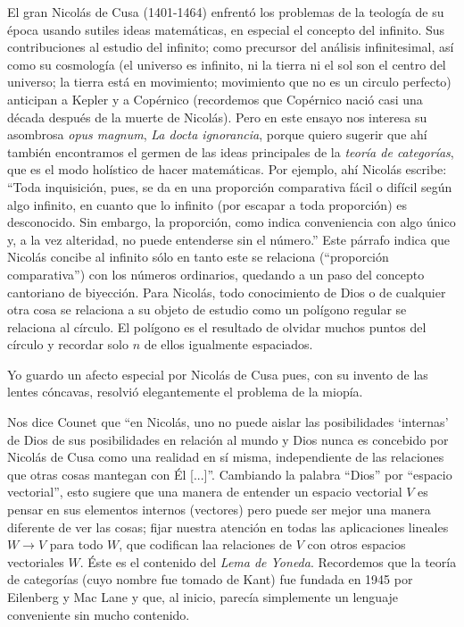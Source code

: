 \documentclass[12pt,a4paper, spanish]{amsart}
\numberwithin{equation}{section}
\theoremstyle{plain}
\theoremstyle{definition}
\begin{document}
El gran Nicolás de Cusa (1401-1464) enfrentó los problemas de la teología de su época usando sutiles ideas matemáticas, en especial el concepto del infinito. Sus contribuciones al estudio del infinito; como precursor del análisis infinitesimal, así como su cosmología (el universo es infinito, ni la tierra ni el sol son el centro del universo; la tierra está en movimiento; movimiento que no es un circulo perfecto) anticipan a Kepler y a Copérnico\autocite{davis2011renaissance} (recordemos que Copérnico nació casi una década después de la muerte de Nicolás). Pero en este ensayo nos interesa su asombrosa \emph{opus magnum}, \emph{La docta ignorancia}\autocite{cusa1984docta}, porque quiero sugerir que ahí también encontramos el germen de las ideas principales de la \emph{teoría de categorías}, que es el modo holístico de hacer matemáticas. Por ejemplo, ahí Nicolás escribe: ``Toda inquisición, pues, se da en una proporción comparativa fácil o difícil según algo infinito, en cuanto que lo infinito (por escapar a toda proporción) es desconocido. Sin embargo, la proporción, como indica conveniencia con algo único y, a la vez alteridad, no puede entenderse sin el número.'' Este párrafo indica que Nicolás concibe al infinito sólo en tanto este se relaciona (``proporción comparativa'') con los números ordinarios, quedando a un paso del concepto cantoriano de biyección. Para Nicolás, todo conocimiento de Dios o de cualquier otra cosa se relaciona a su objeto de estudio como un polígono regular se relaciona al círculo. El polígono es el resultado de olvidar muchos puntos del círculo y recordar solo $n$ de ellos igualmente espaciados.

Yo guardo un afecto especial por Nicolás de Cusa pues, con su invento de las lentes cóncavas, resolvió elegantemente el problema de la miopía. 

Nos dice Counet\autocite{counet2000mathematiques,celeyrette2011mathematics} que ``en Nicolás, uno no puede aislar las posibilidades `internas' de Dios de sus posibilidades en relación al mundo y Dios nunca es concebido por Nicolás de Cusa como una realidad en sí misma, independiente de las relaciones que otras cosas mantegan con Él [...]''. Cambiando la palabra ``Dios'' por ``espacio vectorial'', esto sugiere que una manera de entender un espacio vectorial $V$ es pensar en sus elementos internos (vectores) pero puede ser mejor una manera diferente de ver las cosas; fijar nuestra atención en todas las aplicaciones lineales $W\to V$ para todo $W$, que codifican laa relaciones de $V$ con otros espacios vectoriales $W$. Éste es el contenido del \emph{Lema de Yoneda}. Recordemos que la teoría de categorías (cuyo nombre fue tomado de Kant) fue fundada en 1945 por Eilenberg y Mac Lane y que, al inicio, parecía simplemente un lenguaje conveniente sin mucho contenido.
\end{document}
